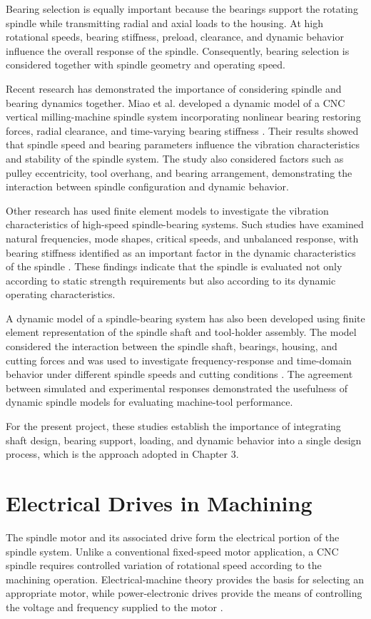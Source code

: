 \documentclass[12pt,a4paper]{report}
\begin{document}
	Bearing selection is equally important because the bearings support the rotating spindle while transmitting radial and axial loads to the housing. At high rotational speeds, bearing stiffness, preload, clearance, and dynamic behavior influence the overall response of the spindle. Consequently, bearing selection is considered together with spindle geometry and operating speed.
	
	Recent research has demonstrated the importance of considering spindle and bearing dynamics together. Miao et al. developed a dynamic model of a CNC vertical milling-machine spindle system incorporating nonlinear bearing restoring forces, radial clearance, and time-varying bearing stiffness \cite{ref11}. Their results showed that spindle speed and bearing parameters influence the vibration characteristics and stability of the spindle system. The study also considered factors such as pulley eccentricity, tool overhang, and bearing arrangement, demonstrating the interaction between spindle configuration and dynamic behavior.
	
	Other research has used finite element models to investigate the vibration characteristics of high-speed spindle-bearing systems. Such studies have examined natural frequencies, mode shapes, critical speeds, and unbalanced response, with bearing stiffness identified as an important factor in the dynamic characteristics of the spindle \cite{ref12}. These findings indicate that the spindle is evaluated not only according to static strength requirements but also according to its dynamic operating characteristics.
	
	A dynamic model of a spindle-bearing system has also been developed using finite element representation of the spindle shaft and tool-holder assembly. The model considered the interaction between the spindle shaft, bearings, housing, and cutting forces and was used to investigate frequency-response and time-domain behavior under different spindle speeds and cutting conditions \cite{ref16}. The agreement between simulated and experimental responses demonstrated the usefulness of dynamic spindle models for evaluating machine-tool performance.
	
	For the present project, these studies establish the importance of integrating shaft design, bearing support, loading, and dynamic behavior into a single design process, which is the approach adopted in Chapter 3.
	
	\section{Electrical Drives in Machining}
	The spindle motor and its associated drive form the electrical portion of the spindle system. Unlike a conventional fixed-speed motor application, a CNC spindle requires controlled variation of rotational speed according to the machining operation. Electrical-machine theory provides the basis for selecting an appropriate motor, while power-electronic drives provide the means of controlling the voltage and frequency supplied to the motor \cite{ref4,ref5,ref6,ref7,ref8}.
	
\end{document}

